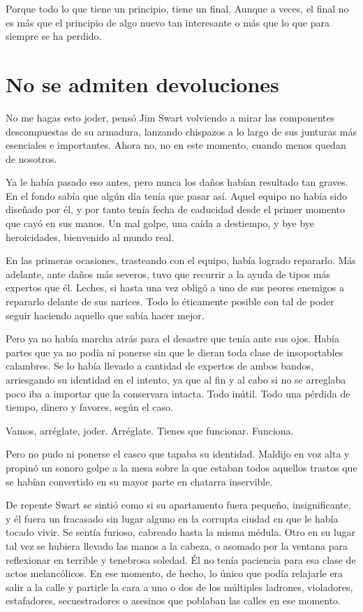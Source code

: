 Porque todo lo que tiene un principio, tiene un final. Aunque a veces, el final no es más que el principio de algo nuevo tan interesante o más que lo que para siempre se ha perdido.
 
\fancyparbreak
\vspace{-\bigskipamount}
\section*{No se admiten devoluciones}

No me hagas esto joder, pensó Jim Swart volviendo a mirar las componentes descompuestas de su armadura, lanzando chispazos a lo largo de sus junturas más esenciales e importantes. Ahora no, no en este momento, cuando menos quedan de nosotros.

Ya le había pasado eso antes, pero nunca los daños habían resultado tan graves. En el fondo sabía que algún día tenía que pasar así. Aquel equipo no había sido diseñado por él, y por tanto tenía fecha de caducidad desde el primer momento que cayó en sus manos. Un mal golpe, una caída a destiempo, y bye bye heroicidades, bienvenido al mundo real.

En las primeras ocasiones, trasteando con el equipo, había logrado repararlo. Más adelante, ante daños más severos, tuvo que recurrir a la ayuda de tipos más expertos que él. Leches, si hasta una vez obligó a uno de sus peores enemigos a repararlo delante de sus narices. Todo lo éticamente posible con tal de poder seguir haciendo aquello que sabía hacer mejor.

Pero ya no había marcha atrás para el desastre que tenía ante sus ojos. Había partes que ya no podía ni ponerse sin que le dieran toda clase de insoportables calambres. Se lo había llevado a cantidad de expertos de ambos bandos, arriesgando su identidad en el intento, ya que al fin y al cabo si no se arreglaba poco iba a importar que la conservara intacta. Todo inútil. Todo una pérdida de tiempo, dinero y favores, según el caso.

Vamos, arréglate, joder. Arréglate. Tienes que funcionar. Funciona.

Pero no pudo ni ponerse el casco que tapaba su identidad. Maldijo en voz alta y propinó un sonoro golpe a la mesa sobre la que estaban todos aquellos trastos que se habían convertido en su mayor parte en chatarra inservible.

De repente Swart se sintió como si su apartamento fuera pequeño, insignificante, y él fuera un fracasado sin lugar alguno en la corrupta ciudad en que le había tocado vivir. Se sentía furioso, cabreado hasta la misma médula. Otro en su lugar tal vez se hubiera llevado las manos a la cabeza, o asomado por la ventana para reflexionar en terrible y tenebrosa soledad. Él no tenía paciencia para esa clase de actos melancólicos. En ese momento, de hecho, lo único que podía relajarle era salir a la calle y partirle la cara a uno o dos de los múltiples ladrones, violadores, estafadores, secuestradores o asesinos que poblaban las calles en ese momento.

